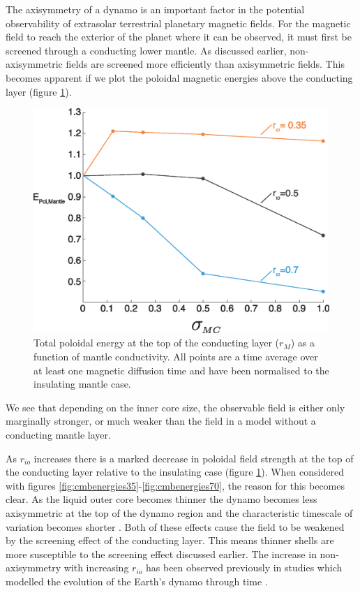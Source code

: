 The axisymmetry of a dynamo is an important factor in the potential observability of extrasolar terrestrial planetary magnetic fields. For the magnetic field to reach the exterior of the planet where it can be observed, it must first be screened through a conducting lower mantle. As  discussed earlier, non-axisymmetric fields are screened more efficiently than axisymmetric fields. This becomes apparent if we plot the poloidal magnetic energies above the conducting layer (figure \ref{fig:ddppoloidaltotal}).
\begin{figure}
\noindent\includegraphics[width=.7\linewidth]{Chapter3/Figures/f4.eps}
\centering
\caption{Total poloidal energy at the top of the conducting layer ($r_{M}$) as a function of mantle conductivity. All points are a time average over at least one magnetic diffusion time and have been normalised to the insulating mantle case.}
\label{fig:ddppoloidaltotal}
\end{figure}
We see that depending on the inner core size, the observable field is either only marginally stronger, or much weaker than the field in a model without a conducting mantle layer.

As $r_{io}$ increases there is a marked decrease in poloidal field strength at the top of the conducting layer relative to the insulating case (figure \ref{fig:ddppoloidaltotal}). When considered with figures \ref{fig:cmbenergies35}-\ref{fig:cmbenergies70}, the reason for this becomes clear. As the liquid outer core becomes thinner the dynamo becomes less axisymmetric at the top of the dynamo region and the characteristic timescale of variation becomes shorter \citep{aubert2009}. Both of these effects cause the field to be weakened by the screening effect of the conducting layer. This means thinner shells are more susceptible to the screening effect discussed earlier. The increase in non-axisymmetry with increasing $r_{io}$ has been observed previously in studies which modelled the evolution of the Earth's dynamo through time \citep{aubert2009, roberts2001}.

